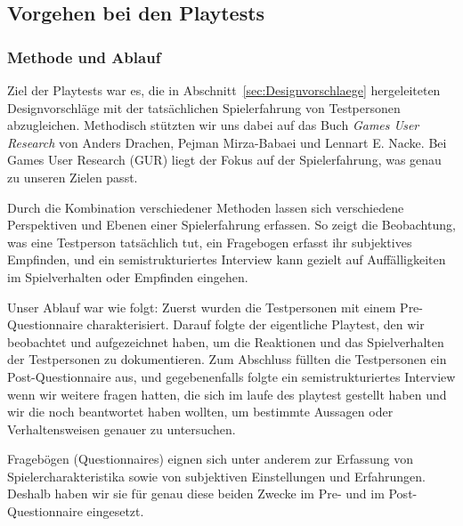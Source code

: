 \documentclass[../Main.tex]{subfiles}
\begin{document}
\subsection{Vorgehen bei den Playtests} \label{sec:VorgehenPlaytest}

\subsubsection{Methode und Ablauf} \label{sec:MethodePlaytest}
Ziel der Playtests war es, die in Abschnitt~\ref{sec:Designvorschlaege} hergeleiteten Designvorschläge mit der tatsächlichen Spielerfahrung von Testpersonen abzugleichen. Methodisch stützten wir uns dabei auf das Buch \textit{Games User Research} von Anders Drachen, Pejman Mirza-Babaei und Lennart E. Nacke.\autocite{drachen2018gamesuserresearch} Bei Games User Research (GUR) liegt der Fokus auf der Spielerfahrung, was genau zu unseren Zielen passt.

Durch die Kombination verschiedener Methoden lassen sich verschiedene Perspektiven und Ebenen einer Spielerfahrung erfassen.\autocite[\textcolor{red}{S.~??}]{drachen2018gamesuserresearch} So zeigt die Beobachtung, was eine Testperson tatsächlich tut, ein Fragebogen erfasst ihr subjektives Empfinden, und ein semistrukturiertes Interview kann gezielt auf Auffälligkeiten im Spielverhalten oder Empfinden eingehen.

Unser Ablauf war wie folgt: Zuerst wurden die Testpersonen mit einem Pre-Questionnaire charakterisiert. Darauf folgte der eigentliche Playtest, den wir beobachtet und aufgezeichnet haben, um die Reaktionen und das Spielverhalten der Testpersonen zu dokumentieren. Zum Abschluss füllten die Testpersonen ein Post-Questionnaire aus, und gegebenenfalls folgte ein semistrukturiertes Interview wenn wir weitere fragen hatten, die sich im laufe des playtest gestellt haben und wir die noch beantwortet haben wollten, um bestimmte Aussagen oder Verhaltensweisen genauer zu untersuchen.

Fragebögen (Questionnaires) eignen sich unter anderem zur Erfassung von Spielercharakteristika sowie von subjektiven Einstellungen und Erfahrungen.\autocite[\textcolor{red}{S.~??}]{drachen2018gamesuserresearch} Deshalb haben wir sie für genau diese beiden Zwecke im Pre- und im Post-Questionnaire eingesetzt.
\end{document}
